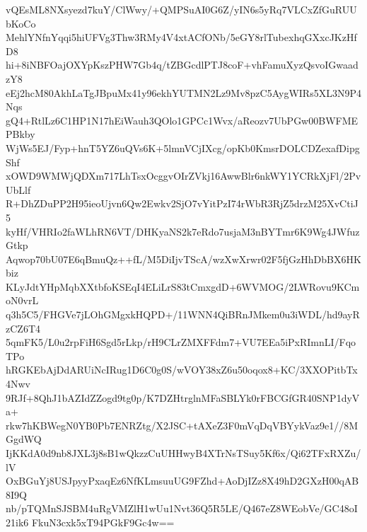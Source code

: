 vQEsML8NXsyezd7kuY/ClWwy/+QMPSuAI0G6Z/yIN6s5yRq7VLCxZfGuRUUbKoCo
MehlYNfnYqqi5hiUFVg3Thw3RMy4V4xtACfONb/5eGY8rlTubexhqGXxcJKzHfD8
hi+8iNBFOajOXYpKszPHW7Gb4q/tZBGcdlPTJ8coF+vhFamuXyzQsvoIGwaadzY8
eEj2hcM80AkhLaTgJBpuMx41y96ekhYUTMN2Lz9Mv8pzC5AygWIRs5XL3N9P4Nqs
gQ4+RtlLz6C1HP1N17hEiWauh3QOlo1GPCc1Wvx/aReozv7UbPGw00BWFMEPBkby
WjWs5EJ/Fyp+hnT5YZ6uQVs6K+5lmnVCjIXcg/opKb0KmsrDOLCDZexafDipgShf
xOWD9WMWjQDXm717LhTsxOcggvOIrZVkj16AwwBlr6nkWY1YCRkXjFl/2PvUbLlf
R+DhZDuPP2H95ieoUjvn6Qw2Ewkv2SjO7vYitPzI74rWbR3RjZ5drzM25XvCtiJ5
kyHf/VHRIo2faWLhRN6VT/DHKyaNS2k7eRdo7usjaM3nBYTmr6K9Wg4JWfuzGtkp
Aqwop70bU07E6qBmuQz++fL/M5DiIjvTScA/wzXwXrwr02F5fjGzHhDbBX6HKbiz
KLyJdtYHpMqbXXtbfoKSEqI4ELiLrS83tCmxgdD+6WVMOG/2LWRovu9KCmoN0vrL
q3h5C5/FHGVe7jLOhGMgxkHQPD+/11WNN4QiBRnJMkem0u3iWDL/hd9ayRzCZ6T4
5qmFK5/L0u2rpFiH6Sgd5rLkp/rH9CLrZMXFFdm7+VU7EEa5iPxRImnLI/FqoTPo
hRGKEbAjDdARUiNcIRug1D6C0g0S/wVOY38xZ6u50oqox8+KC/3XXOPitbTx4Nwv
9RJf+8QhJ1bAZIdZZogd9tg0p/K7DZHtrglnMFaSBLYk0rFBCGfGR40SNP1dyVa+
rkw7hKBWegN0YB0Pb7ENRZtg/X2JSC+tAXeZ3F0mVqDqVBYykVaz9e1//8MGgdWQ
IjKKdA0d9nb8JXL3j8sB1wQkzzCuUHHwyB4XTrNsTSuy5Kf6x/Qi62TFxRXZu/lV
OxBGuYj8USJpyyPxaqEz6NfKLmsuuUG9FZhd+AoDjIZz8X49hD2GXzH00qAB8I9Q
nb/pTQMnSJSBM4uRgVMZlH1wUu1Nvt36Q5R5LE/Q467eZ8WEobVe/GC48oI21ik6
FkuN3cxk5xT94PGkF9Gc4w==
